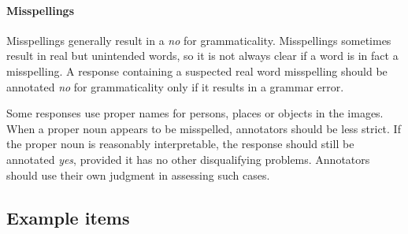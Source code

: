\documentclass[12pt,notitlepage]{article}
\begin{document}
\paragraph{Misspellings} Misspellings generally result in a \textit{no} for grammaticality. Misspellings sometimes result in real but unintended words, so it is not always clear if a word is in fact a misspelling. A response containing a suspected real word misspelling should be annotated \textit{no} for grammaticality only if it results in a grammar error.

Some responses use proper names for persons, places or objects in the images. When a proper noun appears to be misspelled, annotators should be less strict. If the proper noun is reasonably interpretable, the response should still be annotated \textit{yes}, provided it has no other disqualifying problems. Annotators should use their own judgment in assessing such cases.

\clearpage

\subsection{Example items}
\end{document}
